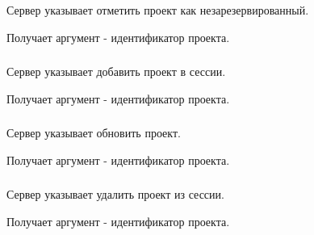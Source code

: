 Сервер указывает отметить проект как незарезервированный.

Получает аргумент  - идентификатор проекта.

\subsubsection{}

Сервер указывает добавить проект в сессии.

Получает аргумент  - идентификатор проекта.

\subsubsection{}

Сервер указывает обновить проект.

Получает аргумент  - идентификатор проекта.

\subsubsection{}

Сервер указывает удалить проект из сессии.

Получает аргумент  - идентификатор проекта.
